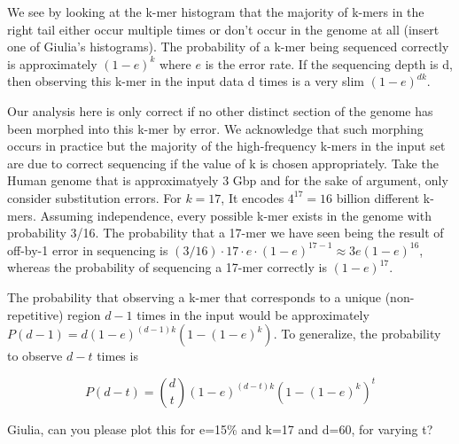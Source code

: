 \documentclass[11pt]{article}
\begin{document}
We see by looking at the k-mer histogram that the majority of k-mers in the right tail either occur multiple times or don't occur in the genome at all (insert one of Giulia's histograms). The probability of a k-mer being sequenced correctly is approximately $(1-e)^k$ where $e$ is the error rate. If the sequencing depth is d, then observing this k-mer in the input data d times  is a very slim 
$(1-e)^{dk}$. 

Our analysis here is only correct if no other distinct section of the genome has been morphed into this k-mer by error. 
We acknowledge that such morphing occurs in practice but the majority of the high-frequency k-mers in the input set are due to correct sequencing if the value of k is chosen appropriately. Take the Human genome that is approximatyely $3$ Gbp and for the sake of argument, only consider substitution errors. For $k=17$, It encodes $4^{17}=16$ billion different k-mers. Assuming independence, every possible k-mer exists in the genome with probability 3/16. The probability that a 17-mer we have seen being the result of off-by-1 error in sequencing is $(3/16) \cdot 17 \cdot e \cdot (1-e)^{17-1} \approx 3 e (1-e)^{16}$, whereas the probability of sequencing a 17-mer correctly is $(1-e)^{17}$.

The probability that observing a k-mer that corresponds to a unique (non-repetitive) region $d-1$ times in the input would be approximately $P(d-1) = d (1-e)^{(d-1)k} (1-(1-e)^k)$. To generalize, the probability to observe $d-t$ times is

 $$P(d-t) = {d \choose t} (1-e)^{(d-t)k} (1-(1-e)^k)^t$$
 
 {\color{red} Giulia, can you please plot this for e=15\% and k=17 and d=60, for varying t?}
 
\end{document}

